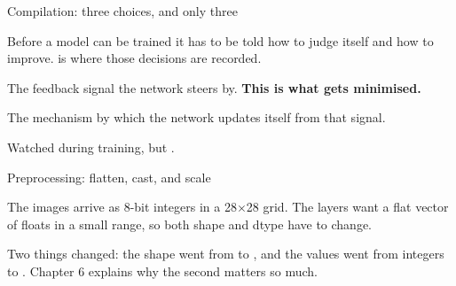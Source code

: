 \documentclass[aspectratio=169,11pt,t]{beamer}
\begin{document}
\begin{frame}[shrink=25]{Compilation: three choices, and only three}
{\fontsize{9.4}{12.6}\selectfont\color{fg2}Before a model can be trained it has to be told how to judge itself and how to improve.  is where those decisions are recorded.\par}\vskip 4pt
\begin{minipage}[t]{0.3253\textwidth}
\begin{icardaccent}
The feedback signal the network steers by. \textbf{This is what gets minimised.}
\end{icardaccent}
\end{minipage}%
\hfill
\begin{minipage}[t]{0.3253\textwidth}
\begin{icardaccent}
The mechanism by which the network updates itself from that signal.
\end{icardaccent}
\end{minipage}%
\hfill
\begin{minipage}[t]{0.3253\textwidth}
\begin{icardaccent}
Watched during training, but .
\end{icardaccent}
\end{minipage}%
\end{frame}

\begin{frame}[shrink=25]{Preprocessing: flatten, cast, and scale}
{\fontsize{9.4}{12.6}\selectfont\color{fg2}The images arrive as 8-bit integers in a 28$\times$28 grid. The  layers want a flat vector of floats in a small range, so both shape and dtype have to change.\par}\vskip 4pt
\begin{iband}[signal]
Two things changed: the shape went from  to , and the values went from  integers to . Chapter 6 explains why the second matters so much.
\end{iband}
\end{frame}
\end{document}

